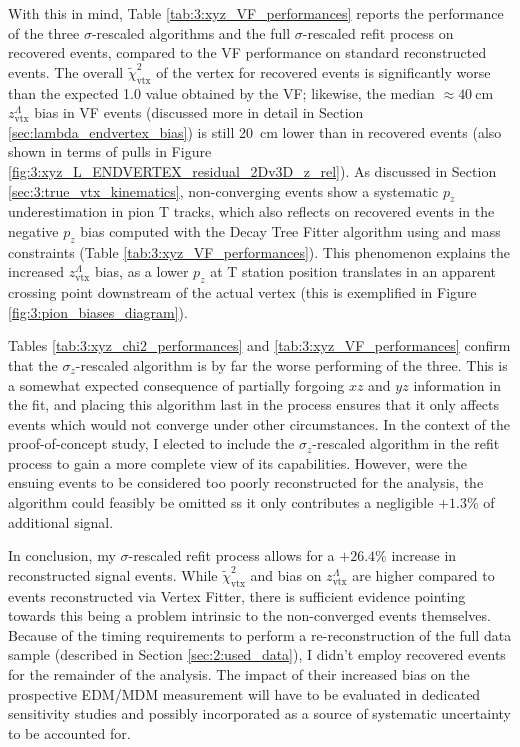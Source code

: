 With this in mind, Table \ref{tab:3:xyz_VF_performances} reports the performance of the three $\sigma$-rescaled algorithms and the full $\sigma$-rescaled refit process on recovered events, compared to the VF performance on standard reconstructed events.
The overall $\tilde{\chi}^2_\text{vtx}$ of the \lambdadecay vertex for recovered events is significantly worse than the expected 1.0 value obtained by the VF;
likewise, the median $\approx \SI{40}{\centi\meter}$ $z_\text{vtx}^\Lambda$ bias in VF events (discussed more in detail in Section \ref{sec:lambda_endvertex_bias}) is still \SI{20}{\centi\meter} lower than in recovered events (also shown in terms of pulls in Figure \ref{fig:3:xyz_L_ENDVERTEX_residual_2Dv3D_z_rel}).
As discussed in Section \ref{sec:3:true_vtx_kinematics}, non-converging events show a systematic $p_z$ underestimation in pion T tracks, which also reflects on recovered events in the negative $p_z$ bias computed with the Decay Tree Fitter algorithm using \jpsi and \lz mass constraints (Table \ref{tab:3:xyz_VF_performances}).
This phenomenon explains the increased $z_\text{vtx}^\Lambda$ bias, as a lower $p_z$ at T station position translates in an apparent crossing point downstream of the actual vertex (this is exemplified in Figure \ref{fig:3:pion_biases_diagram}).


Tables \ref{tab:3:xyz_chi2_performances} and \ref{tab:3:xyz_VF_performances} confirm that the $\sigma_z$-rescaled algorithm is by far the worse performing of the three.
This is a somewhat expected consequence of partially forgoing $xz$ and $yz$ information in the fit, and placing this algorithm last in the process ensures that it only affects events which would not converge under other circumstances.
In the context of the proof-of-concept study, I elected to include the $\sigma_z$-rescaled algorithm in the refit process to gain a more complete view of its capabilities.
However, were the ensuing events to be considered too poorly reconstructed for the \lz analysis, the algorithm could feasibly be omitted ss it only contributes a negligible $+1.3\%$ of additional signal.

In conclusion, my $\sigma$-rescaled refit process allows for a $+26.4\%$ increase in reconstructed signal events.
While $\tilde{\chi}^2_\text{vtx}$ and bias on $z_\text{vtx}^\Lambda$ are higher compared to events reconstructed via Vertex Fitter, there is sufficient evidence pointing towards this being a problem intrinsic to the non-converged events themselves.
Because of the timing requirements to perform a re-reconstruction of the full data sample (described in Section \ref{sec:2:used_data}), I didn't employ recovered events for the remainder of the analysis.
The impact of their increased bias on the prospective \lz EDM/MDM measurement will have to be evaluated in dedicated sensitivity studies and possibly incorporated as a source of systematic uncertainty to be accounted for.


